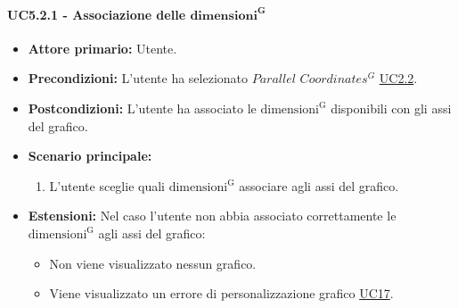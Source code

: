 \paragraph{UC5.2.1 - Associazione delle ${\mathbf{dimensioni^{G}}}$}
\label{sec:UC5.2.1}
    \begin{itemize}
        \item \textbf{Attore primario:} Utente.
        \item \textbf{Precondizioni:} L'utente ha selezionato $Parallel$ $Coordinates^{G}$ \hyperref[sec:UC2.2]{UC2.2}.
	    \item \textbf{Postcondizioni:} L'utente ha associato le ${\mathrm{dimensioni^{G}}}$ disponibili con gli assi del grafico.
	    \item \textbf{Scenario principale:}
	    \begin{enumerate}
	    		\item L'utente sceglie quali ${\mathrm{dimensioni^{G}}}$ associare agli assi del grafico.
		\end{enumerate}
	    \item \textbf{Estensioni:} Nel caso l'utente non abbia associato correttamente le ${\mathrm{dimensioni^{G}}}$ agli assi del grafico:
              \begin{itemize}
                  \item Non viene visualizzato nessun grafico.
                  \item Viene visualizzato un errore di personalizzazione grafico \hyperref[sec:UC17 - Errore di personalizzazione]{UC17}.
              \end{itemize}
    \end{itemize}
